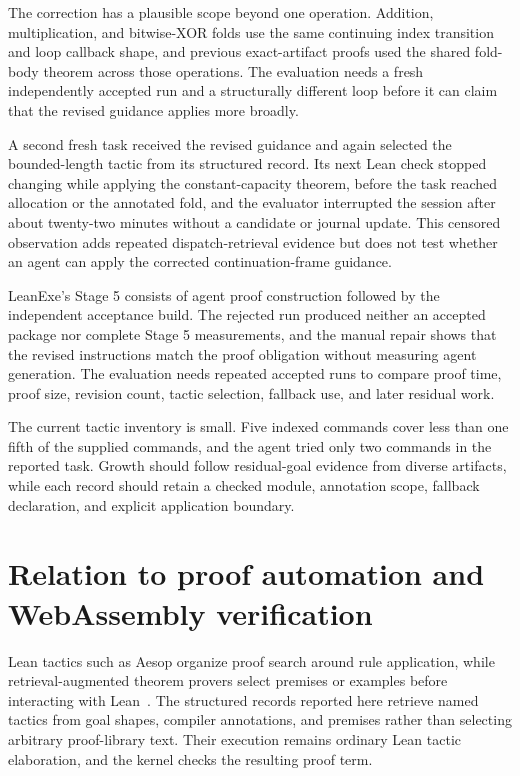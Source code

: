 \documentclass[10pt]{article}
\begin{document}
The correction has a plausible scope beyond one operation.  Addition, multiplication, and bitwise-XOR folds use the same continuing index transition and loop callback shape, and previous exact-artifact proofs used the shared fold-body theorem across those operations.  The evaluation needs a fresh independently accepted run and a structurally different loop before it can claim that the revised guidance applies more broadly.

A second fresh task received the revised guidance and again selected the bounded-length tactic from its structured record.  Its next Lean check stopped changing while applying the constant-capacity theorem, before the task reached allocation or the annotated fold, and the evaluator interrupted the session after about twenty-two minutes without a candidate or journal update.  This censored observation adds repeated dispatch-retrieval evidence but does not test whether an agent can apply the corrected continuation-frame guidance.

LeanExe's Stage 5 consists of agent proof construction followed by the independent acceptance build.  The rejected run produced neither an accepted package nor complete Stage 5 measurements, and the manual repair shows that the revised instructions match the proof obligation without measuring agent generation.  The evaluation needs repeated accepted runs to compare proof time, proof size, revision count, tactic selection, fallback use, and later residual work.

The current tactic inventory is small.  Five indexed commands cover less than one fifth of the supplied commands, and the agent tried only two commands in the reported task.  Growth should follow residual-goal evidence from diverse artifacts, while each record should retain a checked module, annotation scope, fallback declaration, and explicit application boundary.

\section{Relation to proof automation and WebAssembly verification}

Lean tactics such as Aesop organize proof search around rule application, while retrieval-augmented theorem provers select premises or examples before interacting with Lean~\cite{Limperg2023Aesop,Yang2023LeanDojo,Thakur2024COPRA}.  The structured records reported here retrieve named tactics from goal shapes, compiler annotations, and premises rather than selecting arbitrary proof-library text.  Their execution remains ordinary Lean tactic elaboration, and the kernel checks the resulting proof term.
\end{document}
